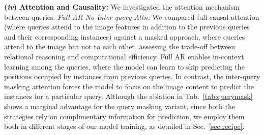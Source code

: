 \noindent \textbf{(\textit{iv}) Attention and Causality:}
We investigated the attention mechanism between queries.
\textit{Full AR \vs No Inter-query Attn:} We compared full causal attention (where queries attend to the image features in addition to the previous queries and their corresponding instances) against a masked approach, where queries attend to the image but not to each other, assessing the trade-off between relational reasoning and computational efficiency. Full AR enables in-context learning among the queries, where the model can learn to skip predicting the positions occupied by instances from previous queries. In contrast, the inter-query masking attention forces the model to focus on the image content to predict the instances for a particular query. Although the ablation in Tab.~\ref{tab:querymask} shows a marginal advantage for the query masking variant, since both the strategies rely on complimentary information for prediction, we employ them both in different stages of our model training, as detailed in Sec.~\ref{sec:recipe}. 
